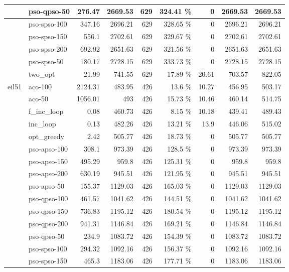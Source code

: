 \documentclass[conference]{IEEEtran}
\begin{document}
\begin{center}
\begin{longtable}[ht]{|l|l|r|r|r|r|r|r|r|}
 & pso-qpso-50 & 276.47 & 2669.53 & 629 & 324.41 \% & 0 & 2669.53 & 2669.53 \\ \hline
 & pso-spso-100 & 347.16 & 2696.21 & 629 & 328.65 \% & 0 & 2696.21 & 2696.21 \\ \hline
 & pso-spso-150 & 556.1 & 2702.61 & 629 & 329.67 \% & 0 & 2702.61 & 2702.61 \\ \hline
 & pso-spso-200 & 692.92 & 2651.63 & 629 & 321.56 \% & 0 & 2651.63 & 2651.63 \\ \hline
 & pso-spso-50 & 180.17 & 2728.15 & 629 & 333.73 \% & 0 & 2728.15 & 2728.15 \\ \hline
 & two\_opt & 21.99 & 741.55 & 629 & 17.89 \% & 20.61 & 703.57 & 822.05 \\ \hline
eil51 & aco-100 & 2124.31 & 483.95 & 426 & 13.6 \% & 10.27 & 456.95 & 503.17 \\ \hline
 & aco-50 & 1056.01 & 493 & 426 & 15.73 \% & 10.46 & 460.14 & 514.75 \\ \hline
 & f\_inc\_loop & 0.08 & 460.73 & 426 & 8.15 \% & 10.18 & 439.41 & 489.43 \\ \hline
 & inc\_loop & 0.13 & 482.26 & 426 & 13.21 \% & 13.9 & 446.06 & 515.02 \\ \hline
 & opt\_greedy & 2.42 & 505.77 & 426 & 18.73 \% & 0 & 505.77 & 505.77 \\ \hline
 & pso-apso-100 & 308.1 & 973.39 & 426 & 128.5 \% & 0 & 973.39 & 973.39 \\ \hline
 & pso-apso-150 & 495.29 & 959.8 & 426 & 125.31 \% & 0 & 959.8 & 959.8 \\ \hline
 & pso-apso-200 & 630.19 & 945.51 & 426 & 121.95 \% & 0 & 945.51 & 945.51 \\ \hline
 & pso-apso-50 & 155.37 & 1129.03 & 426 & 165.03 \% & 0 & 1129.03 & 1129.03 \\ \hline
 & pso-qpso-100 & 461.57 & 1041.62 & 426 & 144.51 \% & 0 & 1041.62 & 1041.62 \\ \hline
 & pso-qpso-150 & 736.83 & 1195.12 & 426 & 180.54 \% & 0 & 1195.12 & 1195.12 \\ \hline
 & pso-qpso-200 & 941.31 & 1146.84 & 426 & 169.21 \% & 0 & 1146.84 & 1146.84 \\ \hline
 & pso-qpso-50 & 234.9 & 1083.72 & 426 & 154.39 \% & 0 & 1083.72 & 1083.72 \\ \hline
 & pso-spso-100 & 294.32 & 1092.16 & 426 & 156.37 \% & 0 & 1092.16 & 1092.16 \\ \hline
 & pso-spso-150 & 465.3 & 1183.06 & 426 & 177.71 \% & 0 & 1183.06 & 1183.06 \\ \hline

\end{longtable}
\end{center}
\end{document}
